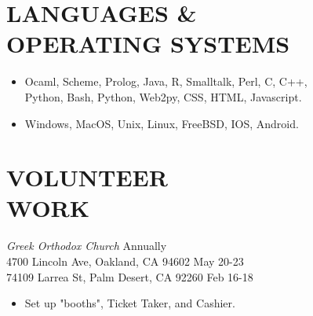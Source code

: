 \documentclass[line,margin]{res}
\begin{document}
\begin{resume}
\section{LANGUAGES \& \\  OPERATING SYSTEMS} 
                           \begin{itemize} \itemsep -3pt
                              \item Ocaml, Scheme, Prolog, Java, R,
                              Smalltalk, Perl, C, C++, \\ Python, Bash,
                              Python, Web2py, CSS, HTML, Javascript.

                           \end{itemize}
                           \begin{itemize} \itemsep -3pt
                              \item Windows, MacOS, Unix, Linux, 
                                    FreeBSD, IOS, Android.
                           \end{itemize} 


\section{VOLUNTEER \\ WORK} 
                  {\sl Greek Orthodox Church } 
                     \hfill Annually \\ 
                  4700 Lincoln Ave, Oakland, CA 94602 
                     \hfill May 20-23 \\
                  74109 Larrea St, Palm Desert, CA 92260 
                     \hfill Feb 16-18 \\
                  \begin{itemize} \itemsep -2pt
                     \item Set up "booths", Ticket Taker, and Cashier. 
                  \end{itemize} 


\end{resume}
\end{document}
